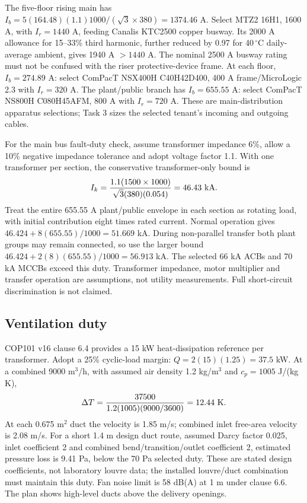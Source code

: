 The five-floor rising main has $I_b=5(164.48)(1.1)1000/(\sqrt3\times380)=1374.46$ A. Select MTZ2 16H1, 1600 A, with $I_r=1440$ A, feeding Canalis KTC2500 copper busway. Its 2000 A allowance for 15--33\% third harmonic, further reduced by 0.97 for 40\,$^\circ$C daily-average ambient, gives 1940 A $>1440$ A. The nominal 2500 A busway rating must not be confused with the riser protective-device frame. At each floor, $I_b=274.89$ A: select ComPacT NSX400H C40H42D400, 400 A frame/MicroLogic 2.3 with $I_r=320$ A. The plant/public branch has $I_b=655.55$ A: select ComPacT NS800H C080H45AFM, 800 A with $I_r=720$ A. These are main-distribution apparatus selections; Task 3 sizes the selected tenant's incoming and outgoing cables.

For the main bus fault-duty check, assume transformer impedance 6\%, allow a 10\% negative impedance tolerance and adopt voltage factor 1.1. With one transformer per section, the conservative transformer-only bound is
\[
I_{k}=\frac{1.1(1500\times1000)}{\sqrt3(380)(0.054)}=46.43\ {\rm kA}.
\]
Treat the entire 655.55 A plant/public envelope in each section as rotating load, with initial contribution eight times rated current. Normal operation gives $46.424+8(655.55)/1000=51.669$ kA. During non-parallel transfer both plant groups may remain connected, so use the larger bound $46.424+2(8)(655.55)/1000=56.913$ kA. The selected 66 kA ACBs and 70 kA MCCBs exceed this duty. Transformer impedance, motor multiplier and transfer operation are assumptions, not utility measurements. Full short-circuit discrimination is not claimed.

\subsection*{Ventilation duty}
COP101 v16 clause 6.4 provides a 15 kW heat-dissipation reference per transformer. Adopt a 25\% cyclic-load margin: $Q=2(15)(1.25)=37.5$ kW. At a combined 9000 m$^3$/h, with assumed air density 1.2 kg/m$^3$ and $c_p=1005$ J/(kg K),
\[
\Delta T=\frac{37500}{1.2(1005)(9000/3600)}=12.44\ {\rm K}.
\]
At each 0.675 m$^2$ duct the velocity is 1.85 m/s; combined inlet free-area velocity is 2.08 m/s. For a short 1.4 m design duct route, assumed Darcy factor 0.025, inlet coefficient 2 and combined bend/transition/outlet coefficient 2, estimated pressure loss is 9.41 Pa, below the 70 Pa selected duty. These are stated design coefficients, not laboratory louvre data; the installed louvre/duct combination must maintain this duty. Fan noise limit is 58 dB(A) at 1 m under clause 6.6. The plan shows high-level ducts above the delivery openings.
